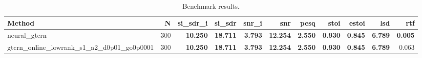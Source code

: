 \begin{table}[t]
\centering
\caption{Benchmark results.}
\label{tab:bench}
\begin{tabular}{lrrrrrrrrrr}
\toprule
Method & N & si\_sdr\_i & si\_sdr & snr\_i & snr & pesq & stoi & estoi & lsd & rtf \\
\midrule
neural_gtcrn & 300 & \textbf{10.250} & \textbf{18.711} & \textbf{3.793} & \textbf{12.254} & \textbf{2.550} & \textbf{0.930} & \textbf{0.845} & \textbf{6.789} & \textbf{0.005} \\
gtcrn_online_lowrank_s1_a2_d0p01_go0p0001 & 300 & \textbf{10.250} & \textbf{18.711} & \textbf{3.793} & \textbf{12.254} & \textbf{2.550} & \textbf{0.930} & \textbf{0.845} & \textbf{6.789} & 0.063 \\
\bottomrule
\end{tabular}
\end{table}